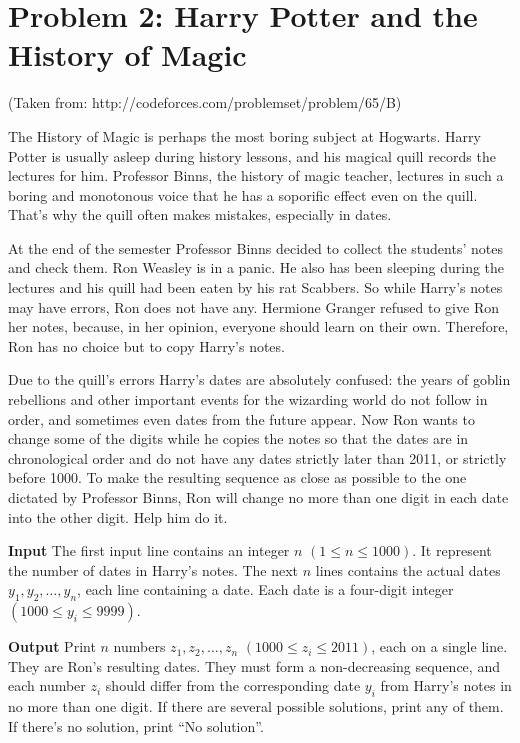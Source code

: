 \normalfont\documentclass[letterpaper,11pt]{article}
\begin{document}
\section*{Problem 2: Harry Potter and the History of Magic}
(Taken from: http://codeforces.com/problemset/problem/65/B)

The History of Magic is perhaps the most boring subject at Hogwarts. Harry Potter is usually asleep during history lessons, and his magical quill records the lectures for him. Professor Binns, the history of magic teacher, lectures in such a boring and monotonous voice that he has a soporific effect even on the quill. That's why the quill often makes mistakes, especially in dates.

At the end of the semester Professor Binns decided to collect the students' notes and check them. Ron Weasley is in a panic. He also has been sleeping during the lectures and his quill had been eaten by his rat Scabbers. So while Harry's notes may have errors, Ron does not have any. Hermione Granger refused to give Ron her notes, because, in her opinion, everyone should learn on their own. Therefore, Ron has no choice but to copy Harry's notes.

Due to the quill's errors Harry's dates are absolutely confused: the years of goblin rebellions and other important events for the wizarding world do not follow in order, and sometimes even dates from the future appear. Now Ron wants to change some of the digits while he copies the notes so that the dates are in chronological order and do not have any dates strictly later than 2011, or strictly before 1000. To make the resulting sequence as close as possible to the one dictated by Professor Binns, Ron will change no more than one digit in each date into the other digit. Help him do it.

\textbf{Input} \newline
The first input line contains an integer $n$ $(1 \leq n \leq 1000)$. It represent the number of dates in Harry's notes. The next $n$ lines contains the actual dates $y_1, y_2, \ldots, y_n$, each line containing a date. Each date is a four-digit integer $(1000 \leq y_i \leq 9999)$.

\textbf{Output} \newline
Print $n$ numbers $z_1, z_2, \ldots, z_n$ $(1000 \leq z_i \leq 2011)$, each on a single line. They are Ron's resulting dates. They must form a non-decreasing sequence, and each number $z_i$ should differ from the corresponding date $y_i$ from Harry's notes in no more than one digit. If there are several possible solutions, print any of them. If there's no solution, print ``No solution''.
\end{document}
